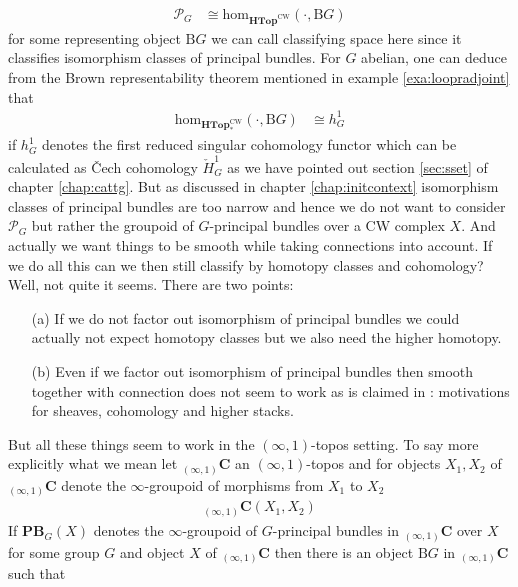 \begin{align*}
  \mathcal{P}_{G}
  &\cong
  \mathrm{hom}_{\mathbf{HTop}^{\textrm{CW}}}(\cdot,\mathrm{B}G)
\end{align*}
for some representing object $\mathrm{B}G$ we can call classifying space here since it classifies isomorphism classes of principal bundles. For $G$ abelian, one can deduce from the Brown representability theorem mentioned in example \ref{exa:loopradjoint} that
\begin{align*}
  \mathrm{hom}_{\mathbf{HTop}_{\ast}^{\textrm{CW}}}(\cdot,\mathrm{B}G)
  &\cong
  h_{G}^{1}
\end{align*}
if $h_{G}^{1}$ denotes the first reduced singular cohomology functor which can be calculated as \v{C}ech cohomology $\check{H}_{G}^{1}$ as we have pointed out section \ref{sec:sset} of chapter \ref{chap:cattg}. But as discussed in chapter \ref{chap:initcontext} isomorphism classes of principal bundles are too narrow and hence we do not want to consider $\mathcal{P}_{G}$ but rather the groupoid of $G$-principal bundles over a CW complex $X$. And actually we want things to be smooth while taking connections into account. If we do all this can we then still classify by homotopy classes and cohomology? Well, not quite it seems. There are two points:
\begin{enumerate}
\item[(a)]
If we do not factor out isomorphism of principal bundles we could actually not expect homotopy classes but we also need the higher homotopy.
\item[(b)]
Even if we factor out isomorphism of principal bundles then {\glqq}smooth{\grqq} together with {\glqq}connection{\grqq} does not seem to work as is claimed in \cite{wiki-nlab0000}: motivations for sheaves, cohomology and higher stacks.
\end{enumerate}
But all these things seem to work in the $(\infty,1)$-topos setting. To say more explicitly what we mean let ${}_{(\infty,1)}\mathbf{C}$ an $(\infty,1)$-topos and for objects $X_{1},X_{2}$ of ${}_{(\infty,1)}\mathbf{C}$ denote the $\infty$-groupoid of morphisms from $X_{1}$ to $X_{2}$
\begin{align*}
  {}_{(\infty,1)}\mathbf{C}
  \left(
    X_{1},
    X_{2}
  \right)
\end{align*}
If $\mathbf{PB}_{G}(X)$ denotes the $\infty$-groupoid of $G$-principal bundles in ${}_{(\infty,1)}\mathbf{C}$ over $X$ for some group $G$ and object $X$ of ${}_{(\infty,1)}\mathbf{C}$ then there is an object $\mathrm{B}G$ in ${}_{(\infty,1)}\mathbf{C}$ such that
